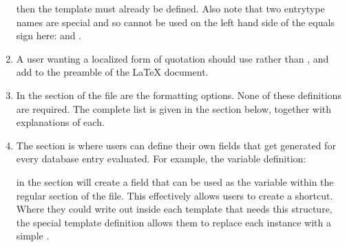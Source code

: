 \documentclass[letterpaper,10pt,english]{sphinxmanual}
\begin{document}
\begin{enumerate}
%
\begin{sphinxVerbatim}[commandchars=\\\{\}]
  
\end{sphinxVerbatim}

then the  template must already be defined. Also note that two entrytype names are special and so cannot be used on the left hand side of the equals sign here:  and .

\item {} 
A user wanting a localized form of quotation should use  rather than , and add  to the preamble of the LaTeX document.

\item {} 
In the  section of the file are the formatting options. None of these definitions are required. The complete list is given in the  section below, together with explanations of each.

\item {} 
The  section is where users can define their own fields that get generated for every database entry evaluated. For example, the variable definition:

%
\begin{sphinxVerbatim}[commandchars=\\\{\}]
  \PYG{p}{[}\PYG{p}{]}
\end{sphinxVerbatim}

in the  section will create a  field that can be used as the variable  within the regular  section of the file. This effectively allows users to create a shortcut. Where they could write out  inside each template that needs this structure, the special template definition allows them to replace each instance with a simple .


\end{enumerate}
\end{document}
